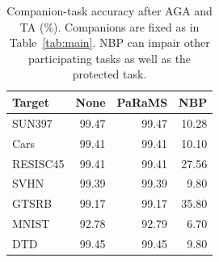 \begin{table}[!t]
\centering
\small
\setlength{\tabcolsep}{4pt}
\caption{Companion-task accuracy after AGA and TA (\%). Companions are fixed as in Table~\ref{tab:main}. NBP can impair other participating tasks as well as the protected task.}
\label{tab:partners}
\begin{tabular}{lrrr}
\toprule
Target & None & PaRaMS & NBP \\
\midrule
SUN397 & 99.47 & 99.47 & 10.28 \\
Cars & 99.41 & 99.41 & 10.10 \\
RESISC45 & 99.41 & 99.41 & 27.56 \\
SVHN & 99.39 & 99.39 & 9.80 \\
GTSRB & 99.17 & 99.17 & 35.80 \\
MNIST & 92.78 & 92.79 & 6.70 \\
DTD & 99.45 & 99.45 & 9.80 \\
\bottomrule
\end{tabular}
\end{table}
